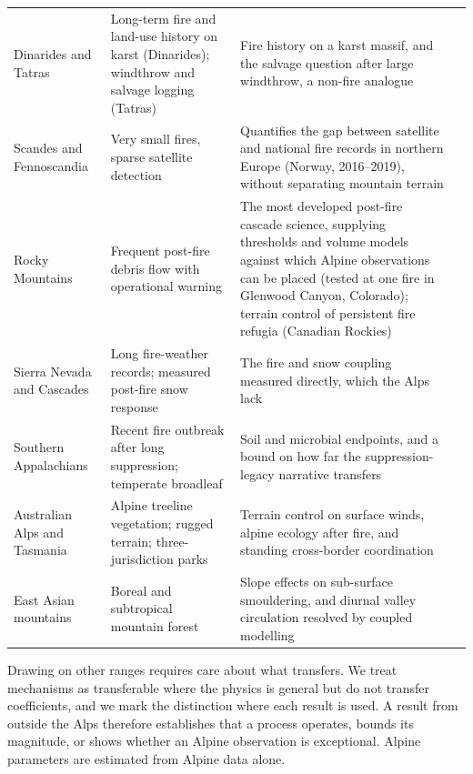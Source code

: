 \documentclass[11pt,a4paper]{article}
\begin{document}
\begin{table}[htbp]
\begin{tabularx}{\textwidth}{@{}>{\raggedright\arraybackslash}p{2.0cm} >{\raggedright\arraybackslash}p{3.3cm} >{\raggedright\arraybackslash}X >{\raggedright\arraybackslash}p{3.1cm}@{}}
Dinarides and Tatras & Long-term fire and land-use history on karst (Dinarides); windthrow and salvage logging (Tatras) & Fire history on a karst massif, and the salvage question after large windthrow, a non-fire analogue & \citealp{cagliero_effect_2022, seben_impact_2024} \\
Scandes and Fennoscandia & Very small fires, sparse satellite detection & Quantifies the gap between satellite and national fire records in northern Europe (Norway, 2016--2019), without separating mountain terrain & \citealp{bakke_datadriven_2023} \\
Rocky Mountains & Frequent post-fire debris flow with operational warning & The most developed post-fire cascade science, supplying thresholds and volume models against which Alpine observations can be placed (tested at one fire in Glenwood Canyon, Colorado); terrain control of persistent fire refugia (Canadian Rockies) & \citealp{rengers_evaluating_2024, rogeau_effect_2018} \\
Sierra Nevada and Cascades & Long fire-weather records; measured post-fire snow response & The fire and snow coupling measured directly, which the Alps lack & \citealp{micheletty_application_2014, koshkin_wildfire_2022} \\
Southern Appalachians & Recent fire outbreak after long suppression; temperate broadleaf & Soil and microbial endpoints, and a bound on how far the suppression-legacy narrative transfers & \citealp{reilly_drivers_2022, snyder_taxonomic_2026} \\
Australian Alps and Tasmania & Alpine treeline vegetation; rugged terrain; three-jurisdiction parks & Terrain control on surface winds, alpine ecology after fire, and standing cross-border coordination & \citealp{sharples_overview_2009, ozaki_impact_2022, wilson_distribution_2022, lockwood_biodiversity_2014} \\
East Asian mountains & Boreal and subtropical mountain forest & Slope effects on sub-surface smouldering, and diurnal valley circulation resolved by coupled modelling & \citealp{shan_influence_2024, wang_dynamic_2026} \\
\bottomrule
\end{tabularx}
\end{table}

Drawing on other ranges requires care about what transfers. We treat mechanisms as transferable where the physics is general but do not transfer coefficients, and we mark the distinction where each result is used. A result from outside the Alps therefore establishes that a process operates, bounds its magnitude, or shows whether an Alpine observation is exceptional. Alpine parameters are estimated from Alpine data alone.
\end{document}
